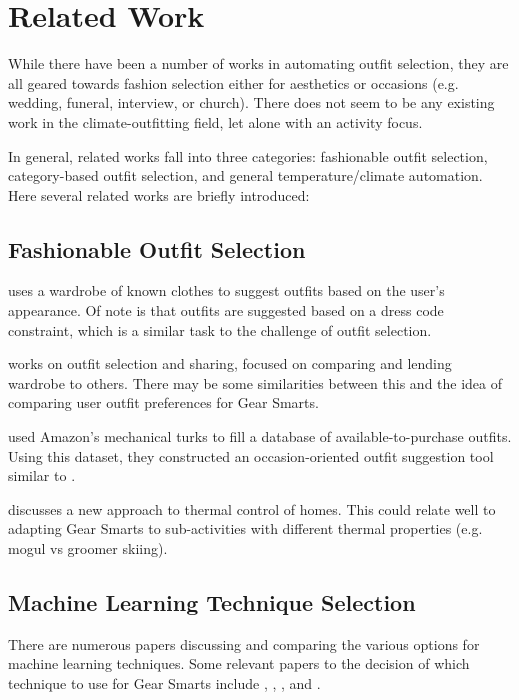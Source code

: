 \section{Related Work}
\label{section:relatedwork}
While there have been a number of works in automating outfit selection, they are all geared towards
fashion selection either for aesthetics or occasions (e.g. wedding, funeral, interview, or church).
There does not seem to be any existing work in the climate-outfitting field, let alone with an
activity focus.

In general, related works fall into three categories: fashionable outfit selection, category-based
outfit selection, and general temperature/climate automation. Here several related works are briefly introduced:

\subsection{Fashionable Outfit Selection}
\cite{Dressup} uses a wardrobe of known clothes to suggest outfits based on the user's appearance.
Of note is that outfits are suggested based on a dress code constraint, which is a similar task to
the challenge of outfit selection.

\cite{SmartCloset} works on outfit selection and sharing, focused on comparing and lending wardrobe
to others. There may be some similarities between this and the idea of comparing user outfit preferences
for Gear Smarts.

\cite{MagicCloset} used Amazon's mechanical turks to fill a database of available-to-purchase outfits.
Using this dataset, they constructed an occasion-oriented outfit suggestion tool similar to \cite{Dressup}.

\cite{ThermalComfort} discusses a new approach to thermal control of homes. This could relate well to
adapting Gear Smarts to sub-activities with different thermal properties (e.g. mogul vs groomer skiing).

\subsection{Machine Learning Technique Selection}
There are numerous papers discussing and comparing the various options for machine learning techniques.
Some relevant papers to the decision of which technique to use for Gear Smarts include \cite{ML:MapReduceClusters},
\cite{ML:ManufacturingSystems}, \cite{ML:IPTraffic}, and \cite{ML:GeoMapping}.
